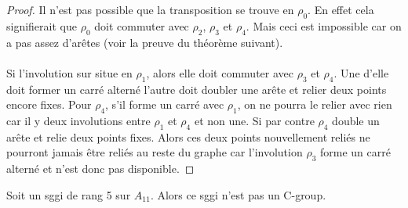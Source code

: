 \begin{proof}
  Il n'est pas possible que la transposition se trouve en $\rho_0$. En effet cela signifierait que $\rho_0$ doit commuter avec $\rho_2$, $\rho_3$ et $\rho_4$. Mais ceci est impossible car on a pas assez d'arêtes (voir la preuve du théorème suivant).

  \paragraph{}
  Si l'involution sur situe en $\rho_1$, alors elle doit commuter avec $\rho_3$ et $\rho_4$. Une d'elle doit former un carré alterné l'autre doit doubler une arête et relier deux points encore fixes. Pour $\rho_4$, s'il forme un carré avec $\rho_1$, on ne pourra le relier avec rien car il y deux involutions entre $\rho_1$ et $\rho_4$ et non une. Si par contre $\rho_4$ double un arête et relie deux points fixes. Alors ces deux points nouvellement reliés ne pourront jamais être reliés au reste du graphe car l'involution $\rho_3$ forme un carré alterné et n'est donc pas disponible.
\end{proof}

\begin{theorem}
  Soit un sggi de rang 5 sur $A_{11}$. Alors ce sggi n'est pas un C-group.
\end{theorem}

